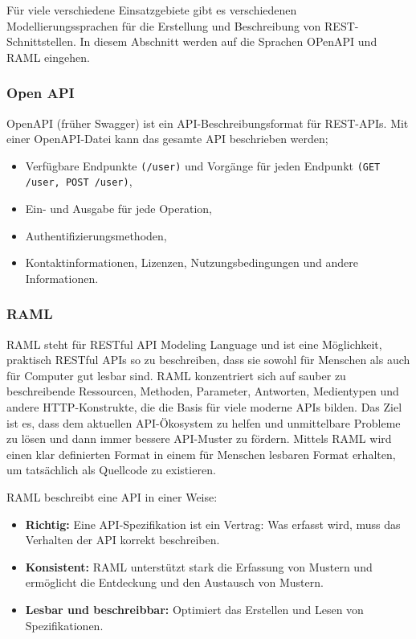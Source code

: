Für viele verschiedene Einsatzgebiete gibt es verschiedenen Modellierungssprachen für die Erstellung und Beschreibung von REST-Schnittstellen. In diesem Abschnitt werden auf die Sprachen OPenAPI und RAML eingehen.

\subsubsection{Open API}



OpenAPI (früher Swagger) ist ein API-Beschreibungsformat für REST-APIs. Mit einer OpenAPI-Datei kann das gesamte API beschrieben werden\cite{openapi13def};

\begin{itemize}
	
	\item Verfügbare Endpunkte \texttt{(/user)} und Vorgänge für jeden Endpunkt \texttt{(GET /user, POST /user)},
	
	\item Ein- und Ausgabe für jede Operation,
	
	\item Authentifizierungsmethoden,
	
	\item Kontaktinformationen, Lizenzen, Nutzungsbedingungen und andere Informationen.
	
\end{itemize}

\subsubsection{RAML}

RAML steht für RESTful API Modeling Language und ist eine Möglichkeit, praktisch RESTful APIs so zu beschreiben, dass sie sowohl für Menschen als auch für Computer gut lesbar sind. RAML konzentriert sich auf sauber zu beschreibende Ressourcen, Methoden, Parameter, Antworten, Medientypen und andere HTTP-Konstrukte, die die Basis für viele moderne APIs bilden. Das Ziel ist es, dass dem aktuellen API-Ökosystem zu helfen und unmittelbare Probleme zu lösen und dann immer bessere API-Muster zu fördern. Mittels RAML wird einen klar definierten Format in einem für Menschen lesbaren Format erhalten, um tatsächlich als Quellcode zu existieren\cite{raml13def}.

RAML beschreibt eine API in einer Weise:

\begin{itemize}
	
	\item \textbf{Richtig:} Eine API-Spezifikation ist ein Vertrag: Was erfasst wird, muss das Verhalten der API korrekt beschreiben.
	
	\item \textbf{Konsistent:} RAML unterstützt stark die Erfassung von Mustern und ermöglicht die Entdeckung und den Austausch von Mustern.
	
	\item \textbf{Lesbar und beschreibbar:} Optimiert das Erstellen und Lesen von Spezifikationen.
	
\end{itemize}

